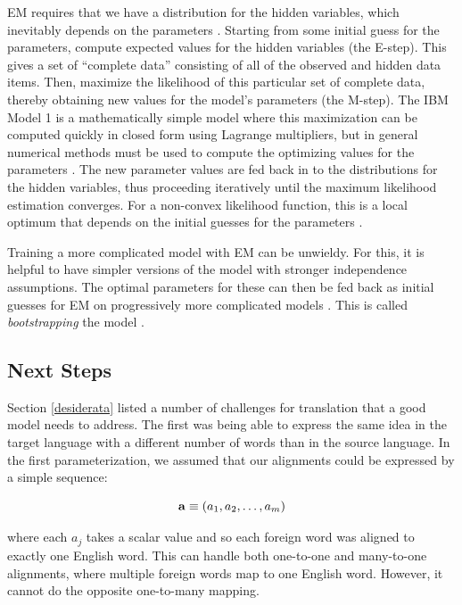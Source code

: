 \documentclass[11pt]{article}
\begin{document}
EM requires that we have a distribution for the hidden variables, which inevitably depends on the parameters  \cite{flach_ml, murphy_ml}.
Starting from some initial guess for the parameters, compute expected values for the hidden variables 
(the E-step). This gives a set of ``complete data'' consisting of all of the observed and hidden data items.
Then, maximize the likelihood of this particular set of complete data, thereby obtaining new
values for the model's parameters (the M-step). The IBM Model 1 is a mathematically 
simple model where this maximization can be computed quickly in closed form using Lagrange multipliers,
but in general numerical methods must be used to compute the optimizing values for the parameters \cite{brown:93}.
The new parameter values are fed back in to the distributions
for the hidden variables, thus proceeding iteratively until the maximum likelihood estimation converges. 
For a non-convex likelihood function, this is a local optimum that depends on the initial guesses for the parameters \cite{flach_ml}.

Training a more complicated model with EM can be unwieldy. For this, it is helpful to have simpler versions of the model
with stronger independence assumptions. The optimal parameters for these can then be fed back as initial guesses
for EM on progressively more complicated models \cite{brown:93}. This is called \textit{bootstrapping} the model \cite{lopez, yamada_knight}.


\subsection{Next Steps}
Section \ref{desiderata} listed a number of challenges for translation that a good model needs to address.
The first was being able to express the same idea in the target language with a different number of words than in the source language.
In the first parameterization, we assumed that our alignments could be expressed by a simple sequence:

\[
    \aa \equiv (a_1, a_2, \dotsc, a_m)
\]

where each $a_j$ takes a scalar value and so each foreign word was aligned to exactly one English word. 
This can handle both one-to-one and many-to-one alignments, where multiple foreign words map to one English word. 
However, it cannot do the opposite one-to-many mapping. 
\end{document}
